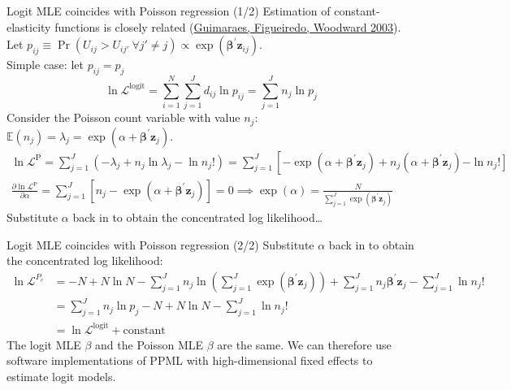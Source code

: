 \documentclass[11pt,notes=hide,aspectratio=169]{beamer}
\begin{document}
\begin{frame}{Logit MLE coincides with Poisson regression (1/2)}
Estimation of constant-elasticity functions is closely related
(\href{https://doi.org/10.1162/003465303762687811}{Guimaraes, Figueiredo, Woodward 2003}).
Let $p_{ij} \equiv \Pr(U_{ij}>U_{ij'} \ \forall j' \neq j) \propto \exp\left(\boldsymbol{\beta}^{\prime} \mathbf{z}_{ij}\right)$.\\
Simple case: let $p_{ij} = p_j$
$$
\ln \mathcal{L}^{\text{logit}} =\sum_{i=1}^N \sum_{j=1}^J d_{i j} \ln p_{i j}=\sum_{j=1}^J n_j \ln p_j
$$
Consider the Poisson count variable with value $n_j$:
$
\mathbb{E}\left(n_j\right)=\lambda_j=\exp \left(\alpha+\boldsymbol{\beta}^{\prime} \mathbf{z}_j\right) .
$
\begin{align*}
\ln \mathcal{L}^{\text{P}}
=
\sum_{j=1}^J\left(-\lambda_j+n_j \ln \lambda_j-\ln n_{j} !\right) 
=
\sum_{j=1}^J\left[-\exp \left(\alpha+\boldsymbol{\beta}^{\prime} \mathbf{z}_j\right)+n_j\left(\alpha+\boldsymbol{\beta}^{\prime} \mathbf{z}_j\right)\right. \left.-\ln n_{j} !\right]
\\
\frac{\partial \ln \mathcal{L}^{\text{P}}}{\partial \alpha}
=
\sum_{j=1}^J\left[n_j-\exp \left(\alpha+\boldsymbol{\beta}^{\prime} \mathbf{z}_j\right)\right]
=0
\implies
\exp (\alpha)=\frac{N}{\sum_{j=1}^J \exp \left(\boldsymbol{\beta}^{\prime} \mathbf{z}_j\right)}
\end{align*}
Substitute $\alpha$ back in to obtain the concentrated log likelihood\dots
\end{frame}
\begin{frame}{Logit MLE coincides with Poisson regression (2/2)}
Substitute $\alpha$ back in to obtain the concentrated log likelihood:
\begin{align*}
\ln \mathcal{L}^{P_c}
&=
-N+N \ln N-\sum_{j=1}^J n_j \ln \left(\sum_{j=1}^J \exp \left(\boldsymbol{\beta}^{\prime} \mathbf{z}_j\right)\right)
+
\sum_{j=1}^J n_j \boldsymbol{\beta}^{\prime} \mathbf{z}_j-\sum_{j=1}^J \ln n_{j} ! 
\\
&=
\sum_{j=1}^J n_j \ln p_j-N+N \ln N-\sum_{j=1}^J \ln n_{j}!
\\
&=
\ln \mathcal{L}^{\text{logit}} + \text{constant}
\end{align*}
The logit MLE $\beta$ and the Poisson MLE $\beta$ are the same.
We can therefore use software implementations of PPML with high-dimensional fixed effects to estimate logit models.
\end{frame}
\end{document}
